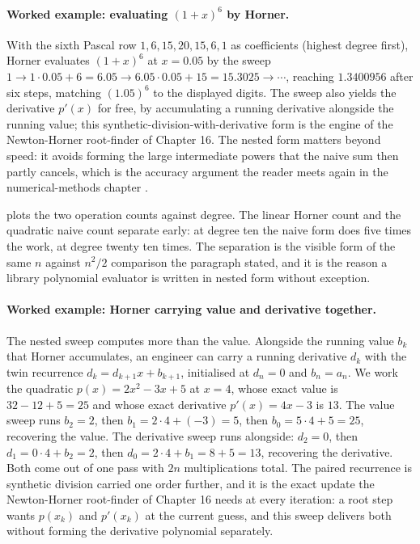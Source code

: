 \paragraph{Worked example: evaluating $(1+x)^{6}$ by Horner.}
With the sixth Pascal row $1, 6, 15, 20, 15, 6, 1$ as coefficients
(highest degree first), Horner evaluates $(1 + x)^{6}$ at $x = 0.05$
by the sweep $1 \to 1 \cdot 0.05 + 6 = 6.05 \to 6.05 \cdot 0.05 + 15 =
15.3025 \to \cdots$, reaching $1.3400956$ after six steps, matching
$(1.05)^{6}$ to the displayed digits. The sweep also yields the
derivative $p'(x)$ for free, by accumulating a running derivative
alongside the running value; this synthetic-division-with-derivative
form is the engine of the Newton-Horner root-finder of Chapter 16. The
nested form matters beyond speed: it avoids forming the large
intermediate powers that the naive sum then partly cancels, which is
the accuracy argument the reader meets again in the numerical-methods
chapter \cite{text:higham-numerical}.



 plots the two operation counts against
degree. The linear Horner count and the quadratic naive count separate
early: at degree ten the naive form does five times the work, at degree
twenty ten times. The separation is the visible form of the same $n$
against $n^{2}/2$ comparison the paragraph stated, and it is the reason
a library polynomial evaluator is written in nested form without
exception.

\paragraph{Worked example: Horner carrying value and derivative
together.} The nested sweep computes more than the value. Alongside the
running value $b_{k}$ that Horner accumulates, an engineer can carry a
running derivative $d_{k}$ with the twin recurrence $d_{k} = d_{k+1} x +
b_{k+1}$, initialised at $d_{n} = 0$ and $b_{n} = a_{n}$. We work the
quadratic $p(x) = 2x^{2} - 3x + 5$ at $x = 4$, whose exact value is
$32 - 12 + 5 = 25$ and whose exact derivative $p'(x) = 4x - 3$ is
$13$. The value sweep runs $b_{2} = 2$, then $b_{1} = 2 \cdot 4 + (-3)
= 5$, then $b_{0} = 5 \cdot 4 + 5 = 25$, recovering the value. The
derivative sweep runs alongside: $d_{2} = 0$, then $d_{1} = 0 \cdot 4 +
b_{2} = 2$, then $d_{0} = 2 \cdot 4 + b_{1} = 8 + 5 = 13$, recovering
the derivative. Both come out of one pass with $2n$ multiplications
total. The paired recurrence is synthetic division carried one order
further, and it is the exact update the Newton-Horner root-finder of
Chapter 16 needs at every iteration: a root step wants $p(x_{k})$ and
$p'(x_{k})$ at the current guess, and this sweep delivers both without
forming the derivative polynomial separately.

